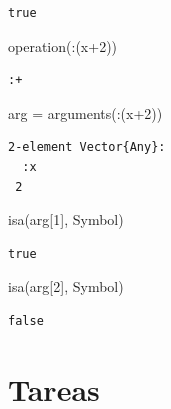 \documentclass[
  a4paper,
]{scrreport}
\newenvironment{Shaded}{\begin{snugshade}}{\end{snugshade}}
\newcommand{\DataTypeTok}[1]{\textcolor[rgb]{0.68,0.00,0.00}{#1}}
\newcommand{\FloatTok}[1]{\textcolor[rgb]{0.68,0.00,0.00}{#1}}
\newcommand{\FunctionTok}[1]{\textcolor[rgb]{0.28,0.35,0.67}{#1}}
\newcommand{\NormalTok}[1]{\textcolor[rgb]{0.00,0.23,0.31}{#1}}
\newcommand{\OperatorTok}[1]{\textcolor[rgb]{0.37,0.37,0.37}{#1}}
\begin{document}
\begin{verbatim}
true
\end{verbatim}

\begin{Shaded}
\begin{Highlighting}[]
\FunctionTok{operation}\NormalTok{(}\OperatorTok{:}\NormalTok{(x}\OperatorTok{+}\FloatTok{2}\NormalTok{))}
\end{Highlighting}
\end{Shaded}

\begin{verbatim}
:+
\end{verbatim}

\begin{Shaded}
\begin{Highlighting}[]
\NormalTok{arg }\OperatorTok{=} \FunctionTok{arguments}\NormalTok{(}\OperatorTok{:}\NormalTok{(x}\OperatorTok{+}\FloatTok{2}\NormalTok{))}
\end{Highlighting}
\end{Shaded}

\begin{verbatim}
2-element Vector{Any}:
  :x
 2
\end{verbatim}

\begin{Shaded}
\begin{Highlighting}[]
\FunctionTok{isa}\NormalTok{(arg[}\FloatTok{1}\NormalTok{], }\DataTypeTok{Symbol}\NormalTok{)}
\end{Highlighting}
\end{Shaded}

\begin{verbatim}
true
\end{verbatim}

\begin{Shaded}
\begin{Highlighting}[]
\FunctionTok{isa}\NormalTok{(arg[}\FloatTok{2}\NormalTok{], }\DataTypeTok{Symbol}\NormalTok{)}
\end{Highlighting}
\end{Shaded}

\begin{verbatim}
false
\end{verbatim}

\section{Tareas}\label{tareas}
\end{document}
